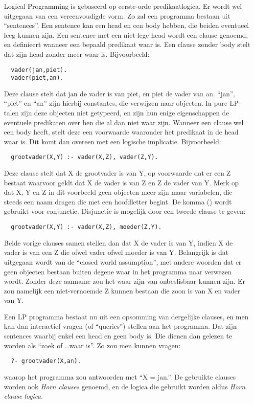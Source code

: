 Logical Programming is gebaseerd op eerste-orde predikaatlogica. Er wordt wel uitgegaan van een vereenvoudigde vorm. Zo zal een programma bestaan uit ``sentences''. Een sentence kan een head en een body hebben, die beiden eventueel leeg kunnen zijn. 
Een sentence met een niet-lege head wordt een clause genoemd, en definieert wanneer een bepaald predikaat waar is. Een clause zonder body stelt dat zijn head zonder meer waar is. Bijvoorbeeld: \begin{Verbatim}
  vader(jan,piet).
  vader(piet,an).
\end{Verbatim}
Deze clause stelt dat jan de vader is van piet, en piet de vader van an. ``jan'', ``piet'' en ``an'' zijn hierbij constantes, die verwijzen naar objecten. In pure LP-talen zijn deze objecten niet getypeerd, en zijn hun enige eigenschappen de eventuele predikaten over hen die al dan niet waar zijn. Wanneer een clause wel een body heeft, stelt deze een voorwaarde waaronder het predikaat in de head waar is. Dit komt dan overeen met een logische implicatie. Bijvoorbeeld: \begin{Verbatim}
  grootvader(X,Y) :- vader(X,Z), vader(Z,Y).
\end{Verbatim}
Deze clause stelt dat X de grootvader is van Y, op voorwaarde dat er een Z bestaat waarvoor geldt dat X de vader is van Z en Z de vader van Y. Merk op dat X, Y en Z in dit voorbeeld geen objecten meer zijn maar variabelen, die steeds een naam dragen die met een hoofdletter begint. De komma (\code{,}) wordt gebruikt voor conjunctie. Disjunctie is mogelijk door een tweede clause te geven: \begin{Verbatim}
  grootvader(X,Y) :- vader(X,Z), moeder(Z,Y).
\end{Verbatim}
Beide vorige clauses samen stellen dan dat X de vader is van Y, indien X de vader is van een Z die ofwel vader ofwel moeder is van Y. Belangrijk is dat uitgegaan wordt van de ``closed world assumption'', met andere woorden dat er geen objecten bestaan buiten degene waar in het programma naar verwezen wordt. Zonder deze aanname zou het waar zijn van  onbeslisbaar kunnen zijn. Er zou namelijk een niet-vernoemde Z kunnen bestaan die zoon is van X en vader van Y.

Een LP programma bestaat nu uit een opsomming van dergelijke clauses, en men kan dan interactief vragen (of ``queries'') stellen aan het programma. Dat zijn sentences waarbij enkel een head en geen body is. Die dienen dan gelezen te worden als ``zoek of \ldots waar is''. Zo zou men kunnen vragen: \begin{Verbatim}
  ?- grootvader(X,an).
\end{Verbatim}
waarop het programma zou antwoorden met ``X = jan.''. De gebruikte clauses worden ook {\em Horn clauses} genoemd, en de logica die gebruikt worden aldus {\em Horn clause logica}.

